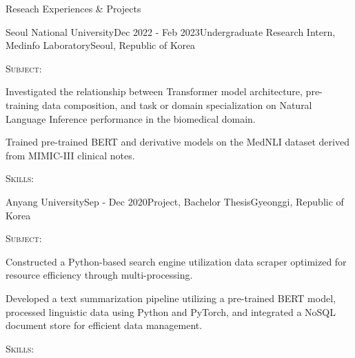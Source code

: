 \documentclass[
	a4paper, %
	11pt, %
]{resume} %
\begin{document}

\begin{rSection}{Reseach Experiences \& Projects}

	\begin{rSubsection}{Seoul National University}{Dec 2022 - Feb 2023}{Undergraduate Research Intern, Medinfo Laboratory}{Seoul, Republic of Korea}
		\item {\textsc{Subject:}}
		\item {Investigated the relationship between Transformer model architecture, pre-training data composition, and task or domain specialization on Natural Language Inference performance in the biomedical domain.}
		\item {Trained pre-trained BERT and derivative models on the MedNLI dataset derived from MIMIC-III clinical notes.}
		\item {\textsc{Skills:}}
	\end{rSubsection}


	\begin{rSubsection}{Anyang University}{Sep - Dec 2020}{Project, Bachelor Thesis}{Gyeonggi, Republic of Korea}
		\item {\textsc{Subject:}}
		\item {Constructed a Python-based search engine utilization data scraper optimized for resource efficiency through multi-processing.}
		\item {Developed a text summarization pipeline utilizing a pre-trained BERT model, processed linguistic data using Python and PyTorch, and integrated a NoSQL document store for efficient data management.}
		\item {\textsc{Skills:}}
	\end{rSubsection}



\end{rSection}
\end{document}
